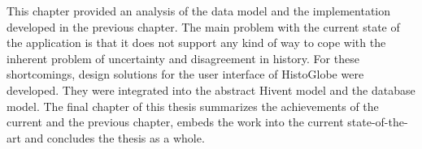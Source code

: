 



\vspace{2em}

This chapter provided an analysis of the data model and the implementation developed in the previous chapter. The main problem with the current state of the application is that it does not support any kind of way to cope with the inherent problem of uncertainty and disagreement in history. For these shortcomings, design solutions for the user interface of HistoGlobe were developed. They were integrated into the abstract Hivent model and the database model. The final chapter of this thesis summarizes the achievements of the current and the previous chapter, embeds the work into the current state-of-the-art and concludes the thesis as a whole.